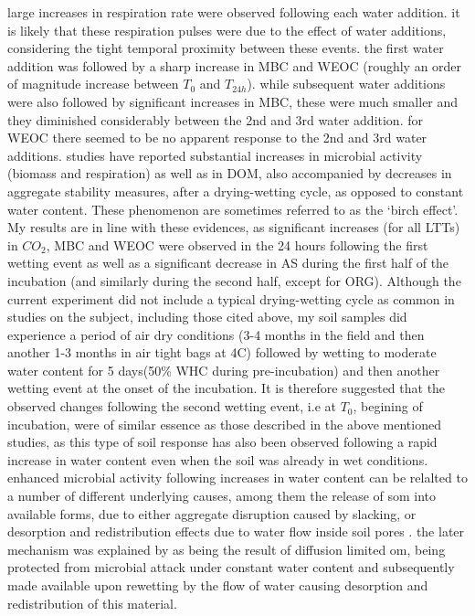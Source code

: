 \documentclass[12pt]{report}
\begin{document}
		large increases in respiration rate were observed following each water addition. it is likely that these respiration pulses were due to the effect of water additions, considering the tight temporal proximity between these events. the first water addition was followed by a sharp increase in MBC and WEOC (roughly an order of magnitude increase between $ T_0 $ and $ T_{24h} $). while subsequent water additions were also followed by significant increases in MBC, these were much smaller and they diminished considerably between the 2nd and 3rd water addition. for WEOC there seemed to be no apparent response to the 2nd and 3rd water additions.
		studies have reported substantial increases in microbial activity (biomass and respiration) as well as in DOM\citep{fierer2003}, also accompanied by decreases in aggregate stability measures\citep{cosentino2006}, after a drying-wetting cycle, as opposed to constant water content. These phenomenon are sometimes referred to as the ‘birch effect’.  My results are in line with these evidences, as significant increases (for all LTTs) in  $CO_2 $, MBC and WEOC  were observed in the 24 hours following the first wetting event as well as a significant decrease in AS during the first half of the incubation (and similarly during the second half, except for ORG). Although the current experiment did not include a typical drying-wetting cycle as common in  studies on the subject, including those cited above, my soil samples did experience a period of air dry conditions (3-4 months in the field  and then another 1-3 months in air tight bags at 4C) followed by wetting to moderate water content for 5 days(50\% WHC during pre-incubation) and then another wetting event at the onset of the incubation. It is therefore suggested that the observed changes following the second wetting event, i.e at $ T_0$, begining of incubation, were of similar essence as those described in the above mentioned studies, as this type of soil response has also been observed following a rapid increase in water content even when the soil was already in wet conditions\citep{xiang2008, rey2005}.
		enhanced microbial activity following increases in water content can be relalted to a number of different underlying causes, among them the release of \gls{som} into available forms, due to either aggregate disruption caused by slacking,  or desorption and redistribution effects due to water flow inside soil pores \citep{xiang2008}. the later mechanism was explained by \citeauthor{xiang2008} as being the result of diffusion limited \gls{om}, being protected from microbial attack under constant water content and subsequently made available upon rewetting by the flow of water causing desorption and redistribution of this material. \\
\end{document}
